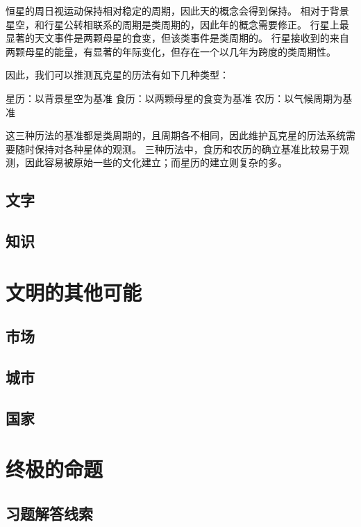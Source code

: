 \documentclass[a4paper,10.5pt]{book}
\begin{document}
恒星的周日视运动保持相对稳定的周期，因此天的概念会得到保持。
相对于背景星空，和行星公转相联系的周期是类周期的，因此年的概念需要修正。
行星上最显著的天文事件是两颗母星的食变，但该类事件是类周期的。
行星接收到的来自两颗母星的能量，有显著的年际变化，但存在一个以几年为跨度的类周期性。

因此，我们可以推测瓦克星的历法有如下几种类型：

星历：以背景星空为基准
食历：以两颗母星的食变为基准
农历：以气候周期为基准

这三种历法的基准都是类周期的，且周期各不相同，因此维护瓦克星的历法系统需要随时保持对各种星体的观测。
三种历法中，食历和农历的确立基准比较易于观测，因此容易被原始一些的文化建立；而星历的建立则复杂的多。

\section{文字}

\section{知识}




\chapter{文明的其他可能}

\section{市场}

\section{城市}

\section{国家}




\chapter{终极的命题}




\begin{appendices}
\chapter{习题解答线索}




\end{appendices}
\end{document}
